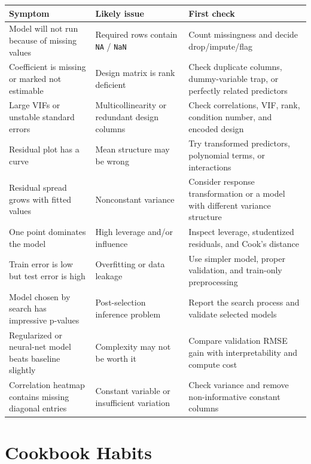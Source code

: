 \begin{center}
\begin{tabular}{>{\raggedright\arraybackslash}p{}>{\raggedright\arraybackslash}p{}>{\raggedright\arraybackslash}p{}}
\hline
Symptom & Likely issue & First check \\
\hline
Model will not run because of missing values & Required rows contain \texttt{NA} / \texttt{NaN} & Count missingness and decide drop/impute/flag \\
Coefficient is missing or marked not estimable & Design matrix is rank deficient & Check duplicate columns, dummy-variable trap, or perfectly related predictors \\
Large VIFs or unstable standard errors & Multicollinearity or redundant design columns & Check correlations, VIF, rank, condition number, and encoded design \\
Residual plot has a curve & Mean structure may be wrong & Try transformed predictors, polynomial terms, or interactions \\
Residual spread grows with fitted values & Nonconstant variance & Consider response transformation or a model with different variance structure \\
One point dominates the model & High leverage and/or influence & Inspect leverage, studentized residuals, and Cook's distance \\
Train error is low but test error is high & Overfitting or data leakage & Use simpler model, proper validation, and train-only preprocessing \\
Model chosen by search has impressive p-values & Post-selection inference problem & Report the search process and validate selected models \\
Regularized or neural-net model beats baseline slightly & Complexity may not be worth it & Compare validation RMSE gain with interpretability and compute cost \\
Correlation heatmap contains missing diagonal entries & Constant variable or insufficient variation & Check variance and remove non-informative constant columns \\
\hline
\end{tabular}
\end{center}

\section{Cookbook Habits}
\label{app:cookbook-habits}

